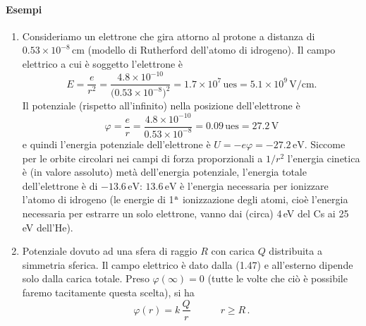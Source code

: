 \paragraph{Esempi}
\begin{enumerate}
  \item Consideriamo un elettrone che gira attorno al protone a distanza di
    $0.53\times10^{-8}$\,cm (modello di Rutherford dell'atomo di idrogeno). Il
    campo elettrico a cui \`e soggetto l'elettrone \`e
    \[
      E=\frac{e}{r^2}=\frac{4.8\times10^{-10}}{\big(0.53\times10^{-8}\big)^2}
      =1.7\times10^7\,\mathrm{ues}=5.1\times10^9\,\mathrm{V/cm}.
    \]
    Il potenziale (rispetto all'infinito) nella posizione dell'elettrone \`e
    \[
      \varphi=\frac{e}{r}=\frac{4.8\times10^{-10}}{0.53\times10^{-8}}
      =0.09\,\mathrm{ues}=27.2\,\mathrm{V}
    \]
    e quindi l'energia potenziale dell'elettrone \`e
    $U=-e\varphi=-27.2\,\mathrm{eV}$. Siccome per le orbite circolari nei campi
    di forza proporzionali a $1/r^2$ l'energia cinetica \`e (in valore assoluto)
    met\`a dell'energia potenziale, l'energia totale dell'elettrone \`e di
    $-13.6\,\mathrm{eV}$: $13.6\,\mathrm{eV}$ \`e l'energia necessaria per
    ionizzare l'atomo di idrogeno (le energie di 1$^{\rm a}$ ionizzazione degli
    atomi, cio\`e l'energia necessaria per estrarre un solo elettrone, vanno dai
    (circa) 4\,eV del Cs ai 25\,eV dell'He).
  \item Potenziale dovuto ad una sfera di raggio $R$ con carica $Q$ distribuita
    a simmetria sferica. Il campo elettrico \`e dato dalla (1.47) e all'esterno
    dipende solo dalla carica totale. Preso $\varphi(\infty)=0$ (tutte le volte
    che ci\`o \`e possibile faremo tacitamente questa scelta), si ha
    \begin{equation}
      \varphi(r)=k\,\frac{Q}{r}\qquad\quad r\ge R\,.
      \tag{1.69}
    \end{equation}


\end{enumerate}
